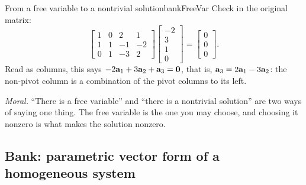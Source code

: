 \documentclass[11pt]{article}
\begin{document}
\begin{exmp}{From a free variable to a nontrivial solution}{bankFreeVar}
Check in the original matrix:
\[
\begin{bmatrix}1&0&2&1\\1&1&-1&-2\\0&1&-3&2\end{bmatrix}\begin{bmatrix}-2\\3\\1\\0\end{bmatrix}=\begin{bmatrix}0\\0\\0\end{bmatrix}.
\]
Read as columns, this says $-2\mathbf{a}_1+3\mathbf{a}_2+\mathbf{a}_3=\mathbf{0}$, that is, $\mathbf{a}_3=2\mathbf{a}_1-3\mathbf{a}_2$: the non-pivot column is a combination of the pivot columns to its left.

\emph{Moral.} ``There is a free variable'' and ``there is a nontrivial solution'' are two ways of saying one thing. The free variable is the one you may choose, and choosing it nonzero is what makes the solution nonzero.
\end{exmp}

\subsection*{Bank: parametric vector form of a homogeneous system}
\end{document}
